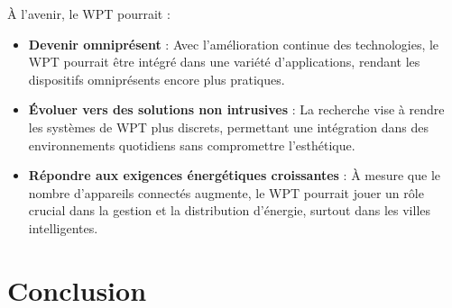 \documentclass[12pt,a4paper,titlepage,notitlepage]{article}
\begin{document}
	À l'avenir, le WPT pourrait :
	\begin{itemize}
		\item \textbf{Devenir omniprésent} : Avec l'amélioration continue des technologies, le WPT pourrait être intégré dans une variété d'applications, rendant les dispositifs omniprésents encore plus pratiques.
		\item \textbf{Évoluer vers des solutions non intrusives} : La recherche vise à rendre les systèmes de WPT plus discrets, permettant une intégration dans des environnements quotidiens sans compromettre l'esthétique.
		\item \textbf{Répondre aux exigences énergétiques croissantes} : À mesure que le nombre d'appareils connectés augmente, le WPT pourrait jouer un rôle crucial dans la gestion et la distribution d'énergie, surtout dans les villes intelligentes.
	\end{itemize}
	
	\newpage
	\section{Conclusion}
	
	
	
	
	

	
	\newpage
\end{document}
